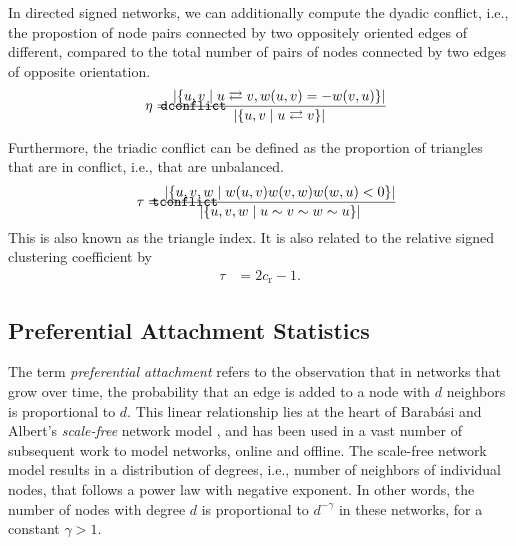\documentclass{article}
\def\mathnote#1{%
  \tag*{\rlap{\hspace\marginparsep\smash{\parbox[t]{\marginparwidth}{#1}}}}
}
\begin{document}
In directed signed networks, we can additionally compute the dyadic
conflict, i.e., the propostion of node pairs connected by two oppositely
oriented edges of different, compared to the total number of pairs of
nodes connected by two edges of opposite orientation. 
\begin{align}
  \mathnote{\texttt{dconflict}}
  \eta &= \frac 
       {|\{ u,v \mid u \rightleftarrows v, w(u,v) = - w(v,u) \}|} 
       {|\{ u, v \mid u \rightleftarrows v \}|}
\end{align}

Furthermore, the triadic conflict can be defined as the proportion of
triangles that are in conflict, i.e., that are unbalanced. 
\begin{align}
  \mathnote{\texttt{tconflict}}  
  \tau &= \frac 
  {|\{ u, v, w \mid w(u, v) w(v, w) w(w, u) < 0\}|}
  {|\{ u, v, w \mid u \sim v \sim w \sim u \}|}
\end{align}
This is also known as the triangle index.
It is also related to the relative signed clustering coefficient by
\begin{align}
\tau &= 2 c_{\mathrm r} - 1.
\end{align}

\subsection{Preferential Attachment Statistics}
The term \emph{preferential attachment} refers to the observation that
in networks that grow over time, the probability that an edge is added
to a node with $d$ neighbors is proportional to $d$.  This linear
relationship lies at the heart of Barabási and Albert's
\emph{scale-free} network model \citep{b439}, and has been used in a vast
number of subsequent work to model networks, online and offline. The
scale-free network model results in a distribution of degrees, i.e.,
number of neighbors of individual nodes, that follows a power law with
negative exponent. In other words, the number of nodes with degree $d$ is
proportional to $d^{-\gamma}$ in these networks, for a constant
$\gamma>1$.
\end{document}
